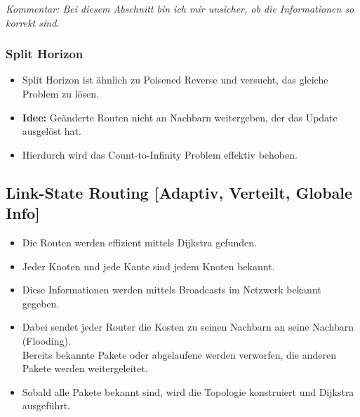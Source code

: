                 \textit{Kommentar: Bei diesem Abschnitt bin ich mir unsicher, ob die Informationen so korrekt sind.} 

            \subsubsection{Split Horizon}
                \begin{itemize}
                	\item Split Horizon ist ähnlich zu Poisened Reverse und versucht, das gleiche Problem zu lösen.
                	\item \textbf{Idee:} Geänderte Routen nicht an Nachbarn weitergeben, der das Update ausgelöst hat.
                	\item Hierdurch wird das Count-to-Infinity Problem effektiv behoben.
                \end{itemize}

        \subsection{Link-State Routing [Adaptiv, Verteilt, Globale Info]}
			\begin{itemize}
				\item Die Routen werden effizient mittels Dijkstra gefunden.
				\item Jeder Knoten und jede Kante sind jedem Knoten bekannt.
				\item Diese Informationen werden mittels Broadcasts im Netzwerk bekannt gegeben.
				\item Dabei sendet jeder Router die Kosten zu seinen Nachbarn an seine Nachbarn (Flooding). \\ Bereits bekannte Pakete oder abgelaufene werden verworfen, die anderen Pakete werden weitergeleitet.
				\item Sobald alle Pakete bekannt sind, wird die Topologie konstruiert und Dijkstra ausgeführt.
			\end{itemize}

